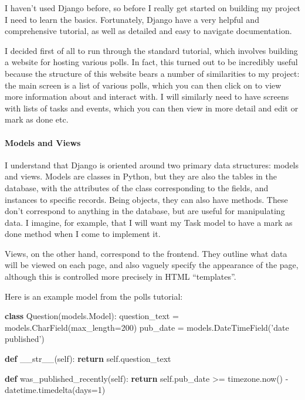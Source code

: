 \documentclass[]{article}
\newenvironment{Shaded}{}{}
\newcommand{\ControlFlowTok}[1]{\textcolor[rgb]{0.00,0.44,0.13}{\textbf{#1}}}
\newcommand{\DecValTok}[1]{\textcolor[rgb]{0.25,0.63,0.44}{#1}}
\newcommand{\FunctionTok}[1]{\textcolor[rgb]{0.02,0.16,0.49}{#1}}
\newcommand{\KeywordTok}[1]{\textcolor[rgb]{0.00,0.44,0.13}{\textbf{#1}}}
\newcommand{\NormalTok}[1]{#1}
\newcommand{\OperatorTok}[1]{\textcolor[rgb]{0.40,0.40,0.40}{#1}}
\newcommand{\StringTok}[1]{\textcolor[rgb]{0.25,0.44,0.63}{#1}}
\newcommand{\VariableTok}[1]{\textcolor[rgb]{0.10,0.09,0.49}{#1}}
\let\oldparagraph\paragraph
\renewcommand{\paragraph}[1]{\oldparagraph{#1}\mbox{}}
\begin{document}
I haven't used Django before, so before I really get started on building
my project I need to learn the basics. Fortunately, Django have a very
helpful and comprehensive tutorial, as well as detailed and easy to
navigate documentation.

I decided first of all to run through the standard tutorial, which
involves building a website for hosting various polls. In fact, this
turned out to be incredibly useful because the structure of this website
bears a number of similarities to my project: the main screen is a list
of various polls, which you can then click on to view more information
about and interact with. I will similarly need to have screens with
lists of tasks and events, which you can then view in more detail and
edit or mark as done etc.

\hypertarget{models-and-views}{%
\paragraph{Models and Views}\label{models-and-views}}

I understand that Django is oriented around two primary data structures:
models and views. Models are classes in Python, but they are also the
tables in the database, with the attributes of the class corresponding
to the fields, and instances to specific records. Being objects, they
can also have methods. These don't correspond to anything in the
database, but are useful for manipulating data. I imagine, for example,
that I will want my Task model to have a mark as done method when I come
to implement it.

Views, on the other hand, correspond to the frontend. They outline what
data will be viewed on each page, and also vaguely specify the
appearance of the page, although this is controlled more precisely in
HTML ``templates''.

Here is an example model from the polls tutorial:

\begin{Shaded}
\begin{Highlighting}[]
\KeywordTok{class}\NormalTok{ Question(models.Model):}
\NormalTok{    question_text }\OperatorTok{=}\NormalTok{ models.CharField(max_length}\OperatorTok{=}\DecValTok{200}\NormalTok{)}
\NormalTok{    pub_date }\OperatorTok{=}\NormalTok{ models.DateTimeField(}\StringTok{'date published'}\NormalTok{)}

    \KeywordTok{def} \FunctionTok{__str__}\NormalTok{(}\VariableTok{self}\NormalTok{):}
        \ControlFlowTok{return} \VariableTok{self}\NormalTok{.question_text}

    \KeywordTok{def}\NormalTok{ was_published_recently(}\VariableTok{self}\NormalTok{):}
        \ControlFlowTok{return} \VariableTok{self}\NormalTok{.pub_date }\OperatorTok{>=}\NormalTok{ timezone.now() }\OperatorTok{-}\NormalTok{ datetime.timedelta(days}\OperatorTok{=}\DecValTok{1}\NormalTok{)}
\end{Highlighting}
\end{Shaded}
\end{document}
